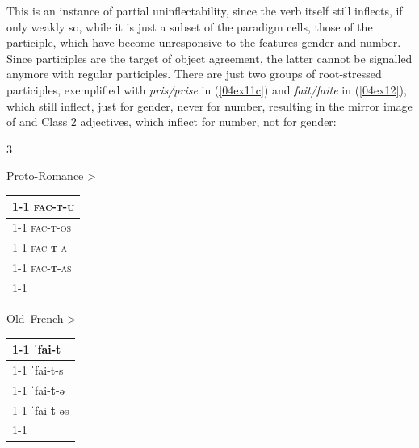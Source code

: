 \documentclass[output=paper,colorlinks,citecolor=brown]{langscibook}
\begin{document}
\bigskip

This is an instance of partial uninflectability, since the verb itself still inflects, if only weakly so, while it is just a subset of the paradigm cells, those of the participle, which have become unresponsive to the features gender and number. Since participles are the target of object agreement, the latter cannot be signalled anymore with regular participles. There are just two groups of root-stressed participles, exemplified with \emph{pris/prise} in (\ref{04ex11c}) and \emph{fait/faite} in (\ref{04ex12}), which still inflect, just for gender, never for number, resulting in the mirror image of  and  Class 2 adjectives, which inflect for number, not for gender:

\bigskip

\noindent \begin{minipage}{\textwidth}
	\setlength{\columnsep}{-0.7cm}
	\begin{multicols}{3}
		\begin{exe}
			\ex \label{04ex12}
			\begin{xlist}
					\ex \label{04ex12a} Proto\nobreakdash-Romance  \hfill >
					\begin{tabularx}{\textwidth}{|l|}
							\cline{1-1}
							\textsc{fac-t-u} \\
							\cline{1-1}
							\textsc{fac-t-os} \\
							\cline{1-1}
							\textsc{fac-\textbf{t}-a} \\
							\cline{1-1}
							\textsc{fac-\textbf{t}-as} \\
							\cline{1-1}
						\end{tabularx}
					
					\columnbreak
				
					\ex \label{04ex12b} Old~French \vspace*{0.1cm}  \hfill >
					\begin{tabularx}{\textwidth}{|l|}
							\cline{1-1}
							ˈfai-t \\
							\cline{1-1}
							ˈfai-t-s \\
							\cline{1-1}
							ˈfai-\textbf{t}-ə \\
							\cline{1-1}
							ˈfai-\textbf{t}-əs \\
							\cline{1-1}
						\end{tabularx}
					
					\columnbreak
					

\end{xlist}
\end{exe}
\end{multicols}
\end{minipage}
\end{document}
